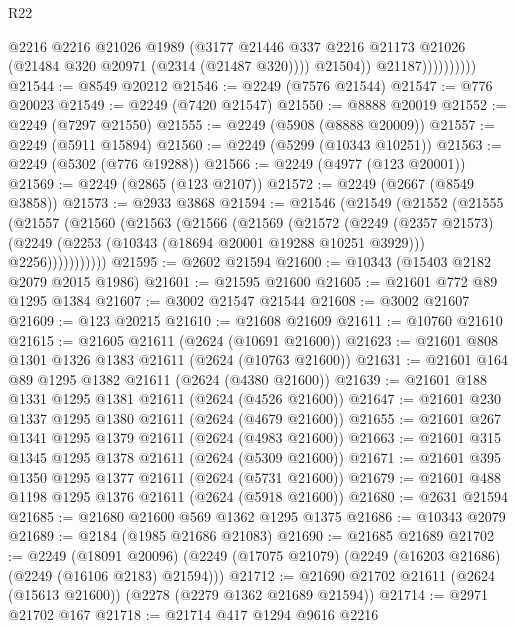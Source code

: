 \begin{lexlean}{R22}
\begin{coremodule}
                            @2216
                            @2216
                            @21026
                            @1989
                            (@3177
                              @21446
                              @337
                              @2216
                              @21173
                              @21026
                              (@21484 @320 @20971 (@2314 (@21487 @320))))
                            @21504))
                        @21187))))))))))
@21544 := @8549 @20212
@21546 := @2249 (@7576 @21544)
@21547 := @776 @20023
@21549 := @2249 (@7420 @21547)
@21550 := @8888 @20019
@21552 := @2249 (@7297 @21550)
@21555 := @2249 (@5908 (@8888 @20009))
@21557 := @2249 (@5911 @15894)
@21560 := @2249 (@5299 (@10343 @10251))
@21563 := @2249 (@5302 (@776 @19288))
@21566 := @2249 (@4977 (@123 @20001))
@21569 := @2249 (@2865 (@123 @2107))
@21572 := @2249 (@2667 (@8549 @3858))
@21573 := @2933 @3868
@21594 := @21546
    (@21549
      (@21552
        (@21555
          (@21557
            (@21560
              (@21563
                (@21566
                  (@21569
                    (@21572
                      (@2249
                        (@2357 @21573)
                        (@2249 (@2253 (@10343 (@18694 @20001 @19288 @10251 @3929))) @2256)))))))))))
@21595 := @2602 @21594
@21600 := @10343 (@15403 @2182 @2079 @2015 @1986)
@21601 := @21595 @21600
@21605 := @21601 @772 @89 @1295 @1384
@21607 := @3002 @21547 @21544
@21608 := @3002 @21607
@21609 := @123 @20215
@21610 := @21608 @21609
@21611 := @10760 @21610
@21615 := @21605 @21611 (@2624 (@10691 @21600))
@21623 := @21601 @808 @1301 @1326 @1383 @21611 (@2624 (@10763 @21600))
@21631 := @21601 @164 @89 @1295 @1382 @21611 (@2624 (@4380 @21600))
@21639 := @21601 @188 @1331 @1295 @1381 @21611 (@2624 (@4526 @21600))
@21647 := @21601 @230 @1337 @1295 @1380 @21611 (@2624 (@4679 @21600))
@21655 := @21601 @267 @1341 @1295 @1379 @21611 (@2624 (@4983 @21600))
@21663 := @21601 @315 @1345 @1295 @1378 @21611 (@2624 (@5309 @21600))
@21671 := @21601 @395 @1350 @1295 @1377 @21611 (@2624 (@5731 @21600))
@21679 := @21601 @488 @1198 @1295 @1376 @21611 (@2624 (@5918 @21600))
@21680 := @2631 @21594
@21685 := @21680 @21600 @569 @1362 @1295 @1375
@21686 := @10343 @2079
@21689 := @2184 (@1985 @21686 @21083)
@21690 := @21685 @21689
@21702 := @2249
    (@18091 @20096)
    (@2249 (@17075 @21079) (@2249 (@16203 @21686) (@2249 (@16106 @2183) @21594)))
@21712 := @21690 @21702 @21611 (@2624 (@15613 @21600)) (@2278 (@2279 @1362 @21689 @21594))
@21714 := @2971 @21702 @167
@21718 := @21714 @417 @1294 @9616 @2216

\end{coremodule}
\end{lexlean}
